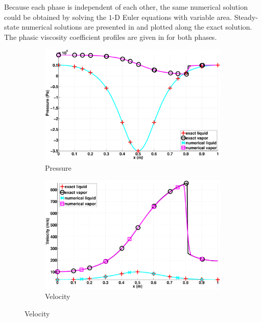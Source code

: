 \documentclass[preprint,10pt]{elsarticle}
\begin{document}
%
Because each phase is independent of each other, the same numerical solution could be obtained by solving the $1$-D Euler equations with variable area. Steady-state numerical solutions are presented in  and plotted along the exact solution. The phasic viscosity coefficient profiles are given in  for both phases.
%
\begin{figure}[H]
        \centering
        \begin{subfigure}[b]{0.495\textwidth}
                \centering
                \includegraphics[width=\textwidth]{figures/nozzle-indep-phase_two_phases_pressure.eps}
                \caption{Pressure}
                \label{fig:nozzle-indep-press}
        \end{subfigure}        
        \begin{subfigure}[b]{0.495\textwidth}
                \centering
                \includegraphics[width=\textwidth]{figures/nozzle-indep-phase_two_phases_velocity.eps}
                \caption{Velocity}
                \label{fig:nozzle-indep-vel}
        \end{subfigure}%


\end{figure}
\end{document}
